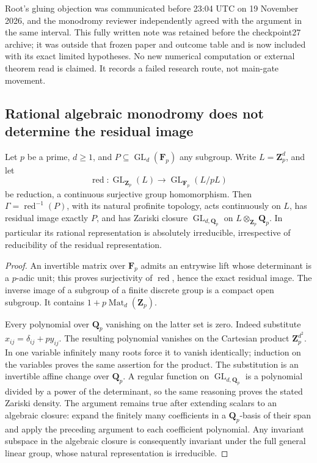 Root's gluing objection was communicated before 23:04 UTC on
19 November 2026, and the monodromy reviewer independently agreed with
the argument in the same interval. This fully written note was retained
before the checkpoint27 archive; it was outside that frozen paper and
outcome table and is now included with its exact limited hypotheses. No new numerical computation or external theorem read is
claimed. It records a failed research route, not main-gate movement.

\subsection{Rational algebraic monodromy does not determine the residual image}

\begin{proposition}
\label{prop:root-rational-residual-obstruction}
Let \(p\) be a prime, \(d\ge1\), and
\(P\subseteq\operatorname{GL}_d(\mathbf F_p)\) any subgroup.
Write \(L=\mathbf Z_p^d\), and let
\[
 \operatorname{red}:\operatorname{GL}_{\mathbf Z_p}(L)
       \longrightarrow\operatorname{GL}_{\mathbf F_p}(L/pL)
\]
be reduction, a continuous surjective group homomorphism. Then
\(\Gamma=\operatorname{red}^{-1}(P)\), with its natural profinite
topology, acts continuously on \(L\), has residual image exactly
\(P\), and has Zariski closure
\(\operatorname{GL}_{d,\mathbf Q_p}\) on
\(L\otimes_{\mathbf Z_p}\mathbf Q_p\).
In particular its rational representation is absolutely irreducible,
irrespective of reducibility of the residual representation.
\end{proposition}
\begin{proof}
An invertible matrix over \(\mathbf F_p\) admits an entrywise lift
whose determinant is a \(p\)-adic unit; this proves surjectivity of
\(\operatorname{red}\), hence the exact residual image. The inverse
image of a subgroup of a finite discrete group is a compact open
subgroup. It contains \(1+p\operatorname{Mat}_d(\mathbf Z_p)\).

Every polynomial over \(\mathbf Q_p\) vanishing on the latter
set is zero. Indeed substitute \(x_{ij}=\delta_{ij}+p y_{ij}\).
The resulting polynomial vanishes on the Cartesian product
\(\mathbf Z_p^{d^2}\). In one variable infinitely many roots force
it to vanish identically; induction on the variables proves the same
assertion for the product. The substitution is an invertible affine
change over \(\mathbf Q_p\). A regular function on
\(\operatorname{GL}_{d,\mathbf Q_p}\) is a polynomial divided by
a power of the determinant, so the same reasoning proves the stated
Zariski density. The argument remains true after extending scalars to
an algebraic closure: expand the finitely many coefficients in a
\(\mathbf Q_p\)-basis of their span and apply the preceding argument
to each coefficient polynomial. Any invariant subspace in the
algebraic closure is consequently invariant under the full general
linear group, whose natural representation is irreducible.
\end{proof}

